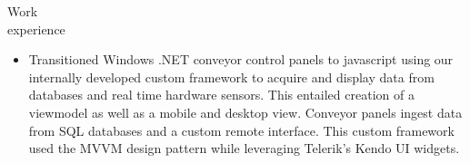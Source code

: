 \begin{category}{Work \\experience}
\begin{itemize}
\item Transitioned Windows .NET conveyor control panels to javascript using our internally developed custom framework to acquire and display data from databases and real time hardware sensors. This entailed creation of a viewmodel as well as a mobile and desktop view. Conveyor panels ingest data from SQL databases and a custom remote interface. This custom framework used the MVVM design pattern while leveraging Telerik's Kendo UI widgets.


\end{itemize}
\end{category}
